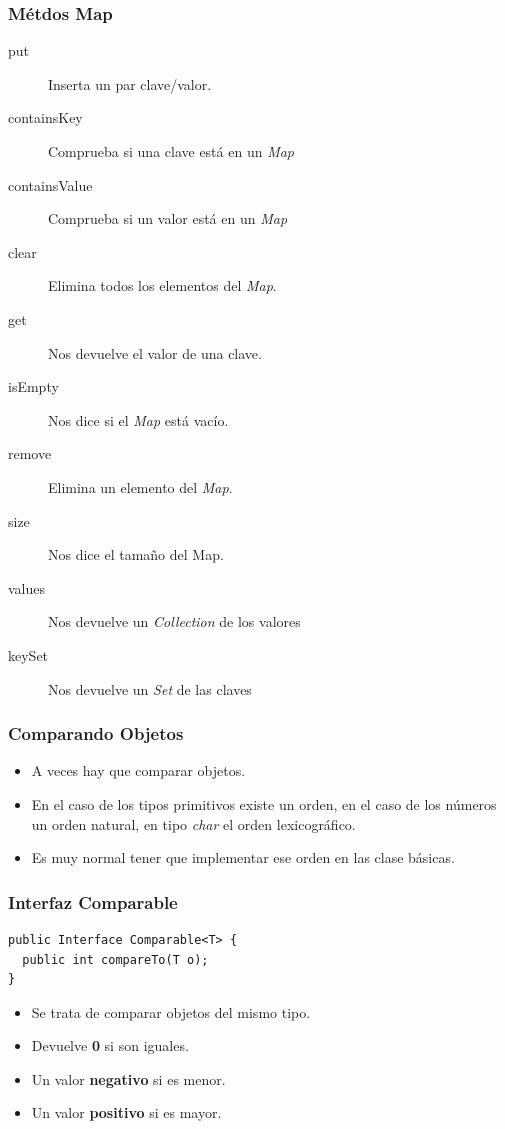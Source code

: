 \documentclass{beamer}
\begin{document}
\begin{frame}
\frametitle{Métdos Map}
\begin{description}
\item[put] Inserta un par clave/valor.
\item[containsKey] Comprueba si una clave está en un \emph{Map}
\item[containsValue] Comprueba si un valor está en un \emph{Map}
\item[clear] Elimina todos los elementos del \emph{Map}.
\item[get] Nos devuelve el valor de una clave.
\item[isEmpty] Nos dice si el \emph{Map} está vacío.
\item[remove] Elimina un elemento del \emph{Map}.
\item[size] Nos dice el tamaño del Map.
\item[values] Nos devuelve un \emph{Collection} de los valores
\item[keySet] Nos devuelve un \emph{Set} de las claves
\end{description}
\end{frame}


\begin{frame}
\frametitle{Comparando Objetos}
\begin{itemize}[<+->]
\item A veces hay que comparar objetos. 
\item En el caso de los tipos primitivos existe un orden, en el caso de los números un orden natural, en tipo \emph{char} el orden lexicográfico.
\item Es muy normal tener que implementar ese orden en las clase básicas.
\end{itemize}
\end{frame}

\begin{frame}[fragile]
\frametitle{Interfaz Comparable}
\begin{verbatim}
public Interface Comparable<T> {
  public int compareTo(T o);
}
\end{verbatim}
\pause
\begin{itemize}[<+->]
\item Se trata de comparar objetos del mismo tipo.
\item Devuelve \textbf{0} si son iguales.
\item Un valor \textbf{negativo} si es menor.
\item Un valor \textbf{positivo} si es mayor.
\end{itemize}
\end{frame}
\end{document}
